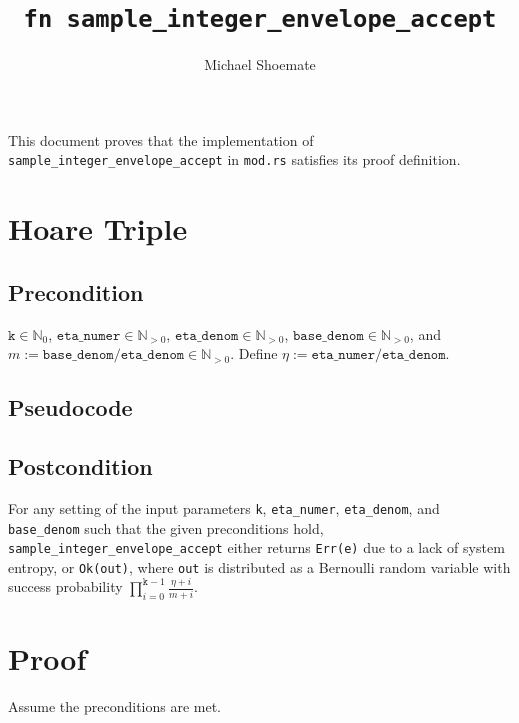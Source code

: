 \documentclass{article}
\title{\texttt{fn sample\_integer\_envelope\_accept}}
\author{Michael Shoemate}
\begin{document}
\maketitle

This document proves that the implementation of \texttt{sample\_integer\_envelope\_accept}
in \texttt{mod.rs} satisfies its proof definition.

\section{Hoare Triple}
\subsection*{Precondition}
$\texttt{k} \in \mathbb{N}_0$, $\texttt{eta\_numer} \in \mathbb{N}_{>0}$,
$\texttt{eta\_denom} \in \mathbb{N}_{>0}$, $\texttt{base\_denom} \in \mathbb{N}_{>0}$,
and $m := \texttt{base\_denom} / \texttt{eta\_denom} \in \mathbb{N}_{>0}$.
Define $\eta := \texttt{eta\_numer} / \texttt{eta\_denom}$.

\subsection*{Pseudocode}


\subsection*{Postcondition}
\label{postcondition}
For any setting of the input parameters \texttt{k}, \texttt{eta\_numer}, \texttt{eta\_denom}, and \texttt{base\_denom}
such that the given preconditions hold,
\texttt{sample\_integer\_envelope\_accept} either returns \texttt{Err(e)} due to a lack of system entropy,
or \texttt{Ok(out)}, where \texttt{out} is distributed as a Bernoulli random variable with success probability
$\prod_{i=0}^{\texttt{k}-1} \frac{\eta + i}{m + i}$.

\section{Proof}
Assume the preconditions are met.
\end{document}
